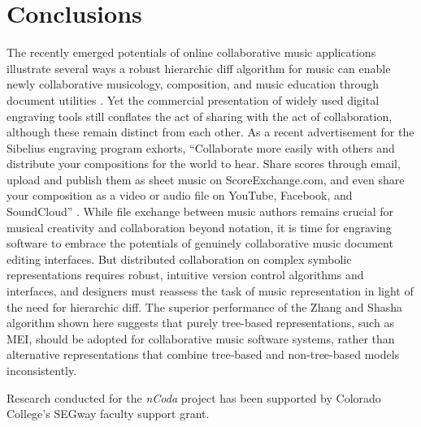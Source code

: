 \documentclass{article}
\begin{document}


\section{Conclusions}
The recently emerged potentials of online collaborative music applications illustrate several ways a robust hierarchic diff algorithm for music can enable newly collaborative musicology, composition, and music education through document utilities \cite{Martin:2015pb,McCulloch:2015pd,Flat:aa,Baca:2015xr}.
Yet the commercial presentation of widely used digital engraving tools still conflates the act of sharing with the act of collaboration,
although these remain distinct from each other.
As a recent advertisement for the Sibelius engraving program exhorts,
``Collaborate more easily with others and distribute your compositions for the world to hear.
Share scores through email, upload and publish them as sheet music on ScoreExchange.com,
and even share your composition as a video or audio file on YouTube, Facebook, and SoundCloud'' \cite{Avid:to}.
While file exchange between music authors remains crucial for musical creativity and collaboration beyond notation,
it is time for engraving software to embrace the potentials of genuinely collaborative music document editing interfaces. But distributed collaboration on complex symbolic representations requires robust, intuitive version control algorithms and interfaces, and designers must reassess the task of music representation in light of the need for hierarchic diff. The superior performance of the Zhang and Shasha algorithm shown here suggests that purely tree-based representations, such as MEI, should be adopted for collaborative music software systems, rather than alternative representations that combine tree-based and non-tree-based models inconsistently.

%
\begin{acknowledgments}
Research conducted for the \emph{nCoda} project has been supported by Colorado College's SEGway faculty support grant.
\end{acknowledgments}

\balance

\end{document}
